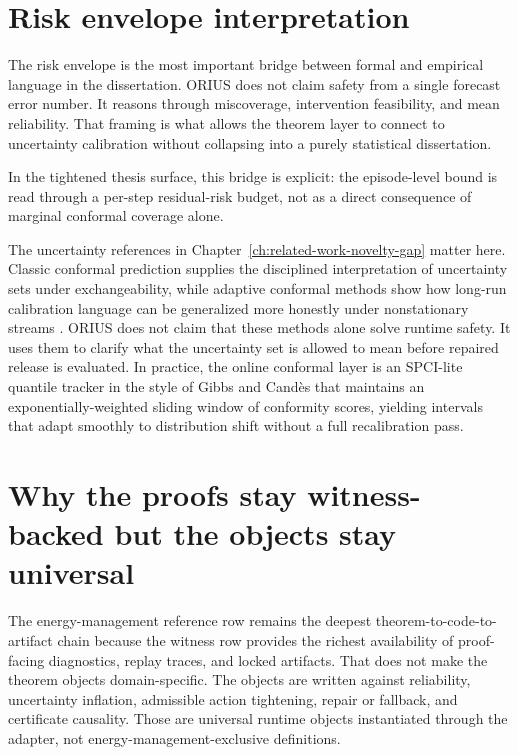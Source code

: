 
\section{Risk envelope interpretation}
The risk envelope is the most important bridge between formal and empirical language in the
dissertation. ORIUS does not claim safety from a single forecast error number. It reasons
through miscoverage, intervention feasibility, and mean reliability. That framing is what
allows the theorem layer to connect to uncertainty calibration without collapsing into a
purely statistical dissertation.

In the tightened thesis surface, this bridge is explicit: the episode-level
bound is read through a per-step residual-risk budget, not as a direct
consequence of marginal conformal coverage alone.

The uncertainty references in Chapter~\ref{ch:related-work-novelty-gap} matter here. Classic
conformal prediction supplies the disciplined interpretation of uncertainty sets under
exchangeability, while adaptive conformal methods show how long-run calibration language can
be generalized more honestly under nonstationary streams
\cite{vovk2005algorithmic,romano2019conformalized,gibbs2021adaptive}. ORIUS does not claim
that these methods alone solve runtime safety. It uses them to clarify what the uncertainty
set is allowed to mean before repaired release is evaluated.  In practice, the online
conformal layer is an SPCI-lite quantile tracker in the style of Gibbs and
Candès \cite{gibbs2021adaptive} that maintains an exponentially-weighted sliding window of
conformity scores, yielding intervals that adapt smoothly to distribution shift without a
full recalibration pass.

\section{Why the proofs stay witness-backed but the objects stay universal}
The energy-management reference row remains the deepest theorem-to-code-to-artifact chain because the witness row
provides the richest availability of proof-facing diagnostics, replay traces, and locked
artifacts. That does not make the theorem objects domain-specific. The objects are written
against reliability, uncertainty inflation, admissible action tightening, repair or
fallback, and certificate causality. Those are universal runtime objects instantiated
through the adapter, not energy-management-exclusive definitions.


